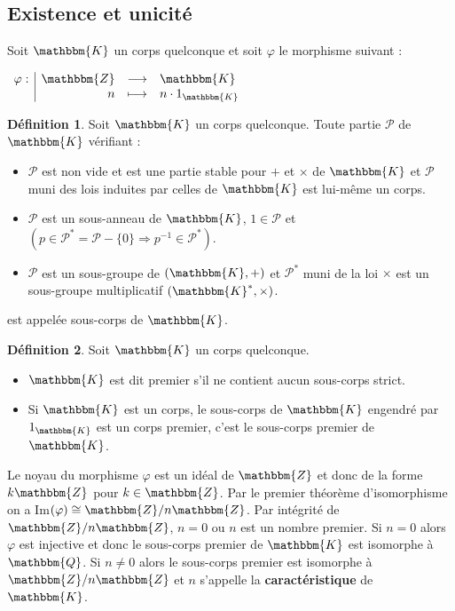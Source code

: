 \documentclass[12pt]{article}
\newcommand{\Z}{\mathbbm{Z}}
\newcommand{\Q}{\mathbbm{Q}}
\newcommand{\K}{\mathbbm{K}}
\theoremstyle{definition}
\newtheorem{definition}{Définition}
\begin{document}
\subsection{Existence et unicité}
\vspace{12pt}
Soit $\K$ un corps quelconque et soit $\varphi$ le morphisme suivant :
\begin{center}
$
\begin{array}{l|rcl}
\varphi : & \Z & \longrightarrow & \K \\
    & n & \longmapsto & n\cdot 1_{\K}
\end{array}
$
\end{center}
\vspace{12pt}
\begin{definition}
Soit $\K$ un corps quelconque. Toute partie $\mathcal{P}$ de $\K$ vérifiant :
\begin{itemize}
\item $\mathcal{P}$ est non vide et est une partie stable pour $+$ et $\times$ de $\K$ et $\mathcal{P}$ muni des lois induites par celles de $\K$ est lui-même un corps.
\item $\mathcal{P}$ est un sous-anneau de $\K$, $1 \in \mathcal{P}$ et $(p \in \mathcal{P}^{*} = \mathcal{P} - \{0 \} \Rightarrow p^{-1} \in \mathcal{P}^{*})$.
\item $\mathcal{P}$ est un sous-groupe de $(\K, +)$ et $\mathcal{P}^{*}$ muni de la loi $\times$ est un sous-groupe multiplicatif $(\K^{*}, \times)$.
\end{itemize}
est appelée sous-corps de $\K$.
\end{definition}
\vspace{12pt}
\begin{definition}
Soit $\K$ un corps quelconque.
\begin{itemize}
\item $\K$ est dit premier s'il ne contient aucun sous-corps strict.
\item Si $\K$ est un corps, le sous-corps de $\K$ engendré par $1_{\mathbbm{K}}$ est un corps premier, c'est le sous-corps premier de $\K$.
\end{itemize}
\end{definition}
\vspace{12pt}
Le noyau du morphisme $\varphi$ est un idéal de $\Z$ et donc de la forme $k\Z$ pour $k \in \Z$. Par le premier théorème d'isomorphisme on a Im$(\varphi) \cong \Z / n \Z$. Par intégrité de $\Z / n \Z$, $n=0$ ou $n$ est un nombre premier. Si $n=0$ alors $\varphi$ est injective et donc le sous-corps premier de $\K$ est isomorphe à $\Q$. Si $n \neq 0$ alors le sous-corps premier est isomorphe à $\Z / n \Z$ et $n$ s'appelle la \textbf{caractéristique} de $\K$. 
\\
\end{document}
